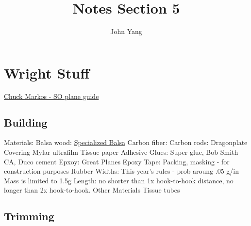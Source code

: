 \documentclass{article}
\title{Notes Section 5} %
\author{John Yang}
\begin{document}
    \maketitle
    \tableofcontents
    \section{Wright Stuff}
    \small \href{https://freeflight.org/wp-content/uploads/2016/02/2009ScienceOlympiadManual.pdf}{Chuck Markos - SO plane guide} \normalsize 
    \subsection{Building}
    \begin{outline}
        \1 Materials:
            \2 Balsa wood:
                \3 \href{https://specializedbalsa.com/}{Specialized Balsa}
            \2 Carbon fiber:
                \3 
            \2 Carbon rods: 
                \3 Dragonplate
            \2 Covering
                \3 Mylar ultrafilm
                \3 Tissue paper
            \2 Adhesive
                \3 Glues: Super glue, Bob Smith CA, Duco cement
                \3 Epxoy: Great Planes Epoxy
                \3 Tape: Packing, masking - for construction purposes
            \2 Rubber
                \3 Widths: This year's rules - prob aroung .05 g/in
                \3 Mass is limited to 1.5g
                \3 Length: no shorter than 1x hook-to-hook distance, no longer than 2x hook-to-hook. 
            \2 Other Materials
                \3 Tissue tubes
                \3 
    \end{outline}
    \subsection{Trimming}
    \begin{outline}
        \1 
    \end{outline}
\end{document}
